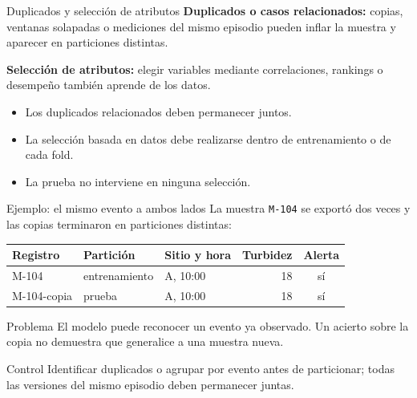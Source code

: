 \documentclass[aspectratio=169,10pt]{beamer}
\begin{document}
\begin{frame}{Duplicados y selección de atributos}
  \small
  \textbf{Duplicados o casos relacionados:} copias, ventanas solapadas o mediciones del mismo episodio pueden inflar la muestra y aparecer en particiones distintas.
  \vspace{.5em}

  \textbf{Selección de atributos:} elegir variables mediante correlaciones, rankings o desempeño también aprende de los datos.
  \begin{itemize}
    \item Los duplicados relacionados deben permanecer juntos.
    \item La selección basada en datos debe realizarse dentro de entrenamiento o de cada fold.
    \item La prueba no interviene en ninguna selección.
  \end{itemize}
\end{frame}

\begin{frame}{Ejemplo: el mismo evento a ambos lados}
  \footnotesize
  La muestra \texttt{M-104} se exportó dos veces y las copias terminaron en particiones distintas:

  \medskip
  \begin{tabularx}{\textwidth}{>{\ttfamily}p{} p{} X r c}
    \toprule \normalfont\textbf{Registro} & \textbf{Partición} & \textbf{Sitio y hora} & \textbf{Turbidez} & \textbf{Alerta} \\ \midrule
    M-104 & entrenamiento & A, 10:00 & 18 & sí \\
    M-104-copia & prueba & A, 10:00 & 18 & sí \\
    \bottomrule
  \end{tabularx}

  \begin{alertblock}{Problema}
    El modelo puede reconocer un evento ya observado. Un acierto sobre la copia no demuestra que generalice a una muestra nueva.
  \end{alertblock}
  \begin{block}{Control}
    Identificar duplicados o agrupar por evento antes de particionar; todas las versiones del mismo episodio deben permanecer juntas.
  \end{block}
\end{frame}
\end{document}
